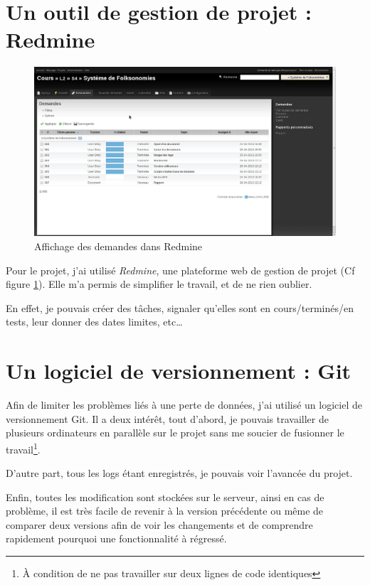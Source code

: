 \documentclass[12pt,a4paper,openany]{book}
\begin{document}
	\section{Un outil de gestion de projet : Redmine}
	\begin{figure}[H]
		\centering
		\includegraphics[width=18cm]{screens/redmine.png} 
		\caption{Affichage des demandes dans Redmine}
		\label{fig:redmine}
	\end{figure}
	Pour le projet, j'ai utilisé \textit{Redmine}, une plateforme web de gestion de projet (Cf figure \ref{fig:redmine}). Elle m'a permis 
	de simplifier le travail, et de ne rien oublier.

	En effet, je pouvais créer des tâches, signaler qu'elles sont en cours/terminés/en tests, leur donner des dates limites,
	etc\ldots 

	\section{Un logiciel de versionnement : Git}
	Afin de limiter les problèmes liés à une perte de données, j'ai utilisé un logiciel de versionnement Git. Il a deux intérêt, tout
	d'abord, je pouvais travailler de plusieurs ordinateurs en parallèle sur le projet sans me soucier de fusionner le travail\footnote{À condition de ne pas travailler sur deux lignes de code identiques}.

	D'autre part, tous les logs étant enregistrés, je pouvais voir l'avancée du projet. 

	Enfin, toutes les modification sont stockées sur le serveur, ainsi en cas de problème, il est très facile de revenir à la version précédente ou même de
	comparer deux versions afin de voir les changements et de comprendre rapidement pourquoi une fonctionnalité à régressé. 
\end{document}
